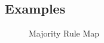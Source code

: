 \subsection{Examples}


\begin{figure}[h]
\begin{center}
\caption{\label{fig:Majority Rule Map}Majority Rule Map}
\end{center}
\end{figure}




